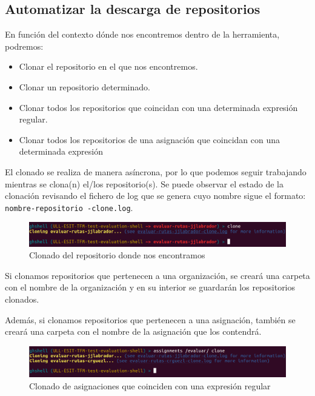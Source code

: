 \subsection{Automatizar la descarga de repositorios}
\label{subsec:3.1.3}  
        	
    En función del contexto dónde nos encontremos dentro de la herramienta, podremos:
    \begin{itemize}
    	\item Clonar el repositorio en el que nos encontremos.
    	\item Clonar un repositorio determinado.
	    \item Clonar todos los repositorios que coincidan con una determinada expresión regular.
	    \item Clonar todos los repositorios de una asignación que coincidan con una determinada expresión
    \end{itemize}
    
    El clonado se realiza de manera asíncrona, por lo que podemos seguir trabajando mientras se clona(n) el/los repositorio(s). Se puede observar el estado de la clonación revisando el fichero de log que se genera cuyo nombre sigue el formato: \verb|nombre-repositorio -clone.log|.
    
    	\begin{figure}[H]
		\begin{center}
		\includegraphics[width=1\textwidth]{images/ghshell6-3}
		\caption{Clonado del repositorio donde nos encontramos}
		\label{fig:ghshell6-3}
		\end{center}
		\end{figure}	

    Si clonamos repositorios que pertenecen a una organización, se creará una carpeta con el nombre de la organización y en su interior se guardarán los repositorios clonados.
    		
	Además, si clonamos repositorios que pertenecen a una asignación, también se creará una carpeta con el nombre de la asignación que los contendrá.
	
        \begin{figure}[H]
		\begin{center}
		\includegraphics[width=1\textwidth]{images/ghshell6-1}
		\caption{Clonado de asignaciones que coinciden con una expresión regular}
		\label{fig:ghshell6-1}
		\end{center}
		\end{figure}	
		
